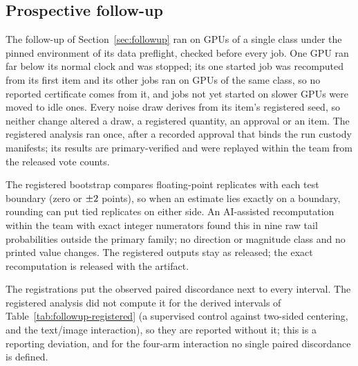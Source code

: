 \subsection{Prospective follow-up}

The follow-up of Section~\ref{sec:followup} ran on GPUs of a single class under
the pinned environment of its data preflight, checked before every job. One GPU
ran far below its normal clock and was stopped; its one started job was
recomputed from its first item and its other jobs ran on GPUs of the same
class, so no reported certificate comes from it, and jobs not yet started on
slower GPUs were moved to idle ones.
Every noise draw derives from its item's registered seed, so neither change
altered a draw, a registered quantity, an approval or an item. The registered
analysis ran once, after a recorded approval that binds the run custody
manifests; its results are primary-verified and were replayed within the team
from the released vote counts.

The registered bootstrap compares floating-point replicates with each test
boundary (zero or $\pm2$ points), so when an estimate lies exactly on a
boundary, rounding can put tied replicates on either side. An AI-assisted
recomputation within the team with exact integer numerators found this in nine
raw tail probabilities outside the primary family; no direction or magnitude
class and no printed value changes. The registered outputs stay as released;
the exact recomputation is released with the artifact.

The registrations put the observed paired discordance next to every interval.
The registered analysis did not compute it for the derived intervals of
Table~\ref{tab:followup-registered} (a supervised control against two-sided
centering, and the text/image interaction), so they are reported without it;
this is a reporting deviation, and for the four-arm interaction no single
paired discordance is defined.
